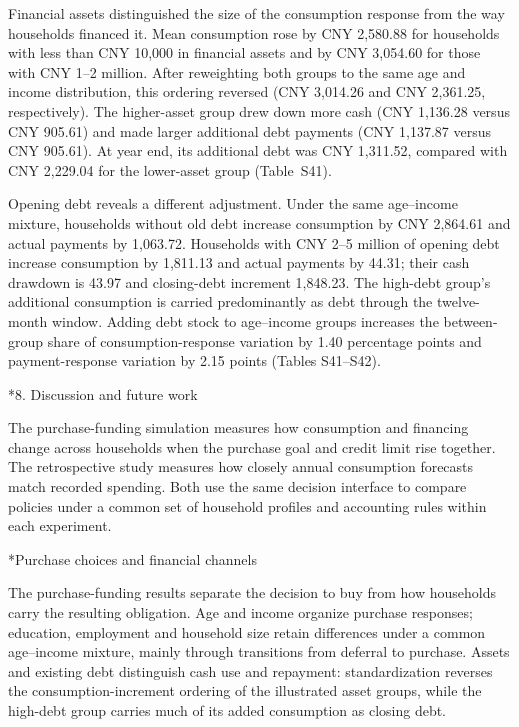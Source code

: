 \documentclass[10pt]{article}
\makeatletter
\renewcommand\section{\@startsection{section}{1}{\z@}{-2.2ex plus -1ex minus -.2ex}{.9ex plus .2ex}{\normalfont\large\mdseries}}
\renewcommand\subsection{\@startsection{subsection}{2}{\z@}{-1.7ex plus -.5ex minus -.2ex}{.6ex plus .2ex}{\normalfont\normalsize\mdseries}}
\makeatother
\begin{document}
Financial assets distinguished the size of the consumption response from the way households financed it. Mean consumption rose by CNY 2,580.88 for households with less than CNY 10,000 in financial assets and by CNY 3,054.60 for those with CNY 1--2 million. After reweighting both groups to the same age and income distribution, this ordering reversed (CNY 3,014.26 and CNY 2,361.25, respectively). The higher-asset group drew down more cash (CNY 1,136.28 versus CNY 905.61) and made larger additional debt payments (CNY 1,137.87 versus CNY 905.61). At year end, its additional debt was CNY 1,311.52, compared with CNY 2,229.04 for the lower-asset group (Table~S41).

Opening debt reveals a different adjustment. Under the same age--income mixture, households without old debt increase consumption by CNY 2,864.61 and actual payments by 1,063.72. Households with CNY 2--5 million of opening debt increase consumption by 1,811.13 and actual payments by 44.31; their cash drawdown is 43.97 and closing-debt increment 1,848.23. The high-debt group's additional consumption is carried predominantly as debt through the twelve-month window. Adding debt stock to age--income groups increases the between-group share of consumption-response variation by 1.40 percentage points and payment-response variation by 2.15 points (Tables S41--S42).


\FloatBarrier
\clearpage

\FloatBarrier
\clearpage
\section*{8. Discussion and future work}

The purchase-funding simulation measures how consumption and financing change across households when the purchase goal and credit limit rise together. The retrospective study measures how closely annual consumption forecasts match recorded spending. Both use the same decision interface to compare policies under a common set of household profiles and accounting rules within each experiment.

\subsection*{Purchase choices and financial channels}

The purchase-funding results separate the decision to buy from how households carry the resulting obligation. Age and income organize purchase responses; education, employment and household size retain differences under a common age--income mixture, mainly through transitions from deferral to purchase. Assets and existing debt distinguish cash use and repayment: standardization reverses the consumption-increment ordering of the illustrated asset groups, while the high-debt group carries much of its added consumption as closing debt.
\end{document}
